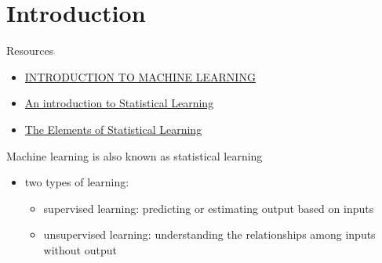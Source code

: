 \documentclass[
]{book}
\providecommand{\tightlist}{%
  \setlength{\itemsep}{0pt}\setlength{\parskip}{0pt}}
\begin{document}
\hypertarget{intro}{%
\chapter{Introduction}\label{intro}}

Resources

\begin{itemize}
\tightlist
\item
  \href{http://alex.smola.org/drafts/thebook.pdf}{INTRODUCTION TO MACHINE LEARNING}
\item
  \href{https://web.stanford.edu/~hastie/ISLRv2_website.pdf}{An introduction to Statistical Learning}
\item
  \href{https://web.stanford.edu/~hastie/ElemStatLearn/printings/ESLII_print12.pdf}{The Elements of Statistical Learning}
\end{itemize}

Machine learning is also known as statistical learning

\begin{itemize}
\item
  two types of learning:

  \begin{itemize}
  \item
    supervised learning: predicting or estimating output based on inputs
  \item
    unsupervised learning: understanding the relationships among inputs without output
  \end{itemize}
\end{itemize}
\end{document}
